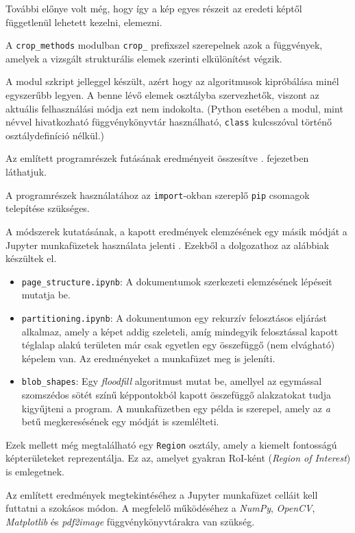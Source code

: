 További előnye volt még, hogy így a kép egyes részeit az eredeti képtől függetlenül lehetett kezelni, elemezni.

A \texttt{crop\_methods} modulban \texttt{crop\_} prefixszel szerepelnek azok a függvények, amelyek a vizsgált strukturális elemek szerinti elkülönítést végzik.

A modul szkript jelleggel készült, azért hogy az algoritmusok kipróbálása minél egyszerűbb legyen.
A benne lévő elemek osztályba szervezhetők, viszont az aktuális felhasználási módja ezt nem indokolta. (Python esetében a modul, mint névvel hivatkozható függvénykönyvtár használható, \texttt{class} kulcsszóval történő osztálydefiníció nélkül.)

Az említett programrészek futásának eredményeit összesítve . fejezetben láthatjuk.

A programrészek használatához az \texttt{import}-okban szereplő \texttt{pip} csomagok telepítése szükséges.


A módszerek kutatásának, a kapott eredmények elemzésének egy másik módját a Jupyter munkafüzetek használata jelenti \cite{jupyter}.
Ezekből a dolgozathoz az alábbiak készültek el.
\begin{itemize}
\item \texttt{page\_structure.ipynb}: A dokumentumok szerkezeti elemzésének lépéseit mutatja be.
\item \texttt{partitioning.ipynb}: A dokumentumon egy rekurzív felosztásos eljárást alkalmaz, amely a képet addig szeleteli, amíg mindegyik felosztással kapott téglalap alakú területen már csak egyetlen egy összefüggő (nem elvágható) képelem van. Az eredményeket a munkafüzet meg is jeleníti.
\item \texttt{blob\_shapes}: Egy \textit{floodfill} algoritmust mutat be, amellyel az egymással szomszédos sötét színű képpontokból kapott összefüggő alakzatokat tudja kigyűjteni a program. A munkafüzetben egy példa is szerepel, amely az \emph{a} betű megkeresésének egy módját is szemlélteti.
\end{itemize}

Ezek mellett még megtalálható egy \texttt{Region} osztály, amely a kiemelt fontosságú képterületeket reprezentálja. Ez az, amelyet gyakran RoI-ként (\textit{Region of Interest}) is emlegetnek.

Az említett eredmények megtekintéséhez a Jupyter munkafüzet celláit kell futtatni a szokásos módon. A megfelelő működéséhez a \textit{NumPy}, \textit{OpenCV}, \textit{Matplotlib} és \textit{pdf2image} függvénykönyvtárakra van szükség.
